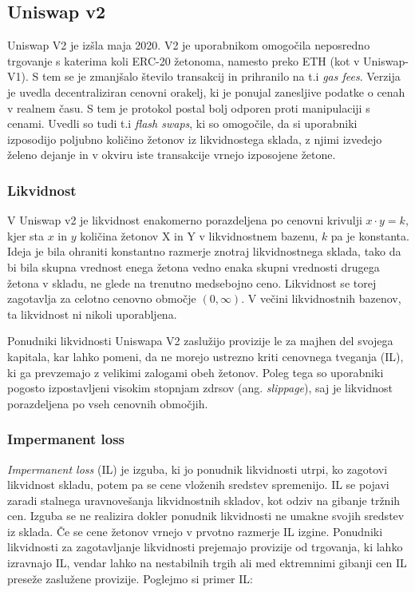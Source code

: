 \documentclass[a4paper,12pt]{article}%
\begin{document}
\subsection{Uniswap v2}
Uniswap V2 je izšla maja 2020. V2 je uporabnikom omogočila neposredno trgovanje s katerima koli ERC-20 žetonoma, namesto preko ETH (kot v Uniswap-V1). S tem se je zmanjšalo število transakcij in prihranilo na t.i \textit{gas fees}. Verzija je uvedla decentraliziran cenovni orakelj, ki je ponujal zanesljive podatke o cenah v realnem času. S tem je protokol postal bolj odporen proti manipulaciji s cenami. Uvedli so tudi t.i \textit{flash swaps}, ki so omogočile, da si uporabniki izposodijo poljubno količino žetonov iz likvidnostega sklada, z njimi izvedejo želeno dejanje in v okviru iste transakcije vrnejo izposojene žetone. 

\subsubsection{Likvidnost} 
V Uniswap v2 je likvidnost enakomerno porazdeljena po cenovni krivulji $x\cdot y = k$, kjer sta $x$ in $y$ količina žetonov X in Y v likvidnostnem bazenu, $k$ pa je konstanta. Ideja je bila ohraniti konstantno razmerje znotraj likvidnostnega sklada, tako da bi bila skupna vrednost enega žetona vedno enaka skupni vrednosti drugega žetona v skladu, ne glede na trenutno medsebojno ceno.  Likvidnost se torej zagotavlja za celotno cenovno območje $(0,\infty)$. V večini likvidnostnih bazenov, ta likvidnost ni nikoli uporabljena. 

Ponudniki likvidnosti Uniswapa V2 zaslužijo provizije le za majhen del svojega kapitala, kar lahko pomeni, da ne morejo ustrezno kriti cenovnega tveganja (IL), ki ga prevzemajo z velikimi zalogami obeh žetonov. Poleg tega so uporabniki pogosto izpostavljeni visokim stopnjam zdrsov (ang. \textit{slippage}), saj je likvidnost porazdeljena po vseh cenovnih območjih. 




\subsubsection{Impermanent loss}
\textit{Impermanent loss} (IL) je izguba, ki jo ponudnik likvidnosti utrpi, ko zagotovi likvidnost skladu, potem pa se cene vloženih sredstev spremenijo. IL se pojavi zaradi stalnega uravnovešanja likvidnostnih skladov, kot odziv na gibanje tržnih cen. Izguba se ne realizira dokler ponudnik likvidnosti ne umakne svojih sredstev iz sklada. Če se cene žetonov vrnejo v prvotno razmerje IL izgine. Ponudniki likvidnosti za zagotavljanje likvidnosti prejemajo provizije od trgovanja, ki lahko izravnajo IL, vendar lahko na nestabilnih trgih ali med ektremnimi gibanji cen IL preseže zaslužene provizije. 
\newline
Poglejmo si primer IL:
\end{document}
